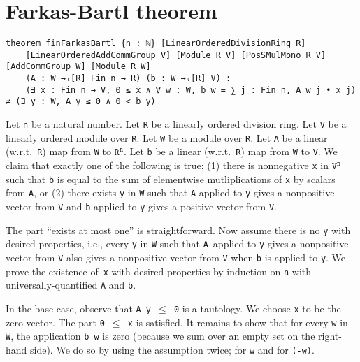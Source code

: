 \documentclass[]{article}
\begin{document}
	

\section {Farkas-Bartl theorem}

\begin{lstlisting}
theorem finFarkasBartl {n : ℕ} [LinearOrderedDivisionRing R]
    [LinearOrderedAddCommGroup V] [Module R V] [PosSMulMono R V] [AddCommGroup W] [Module R W]
    (A : W →ₗ[R] Fin n → R) (b : W →ₗ[R] V) :
    (∃ x : Fin n → V, 0 ≤ x ∧ ∀ w : W, b w = ∑ j : Fin n, A w j • x j) ≠ (∃ y : W, A y ≤ 0 ∧ 0 < b y)
\end{lstlisting}
Let \texttt{n} be a natural number.
Let \texttt{R} be a linearly ordered division ring.
Let \texttt{V} be a linearly ordered module over \texttt{R}.
Let \texttt{W} be a module over \texttt{R}.
Let \texttt{A} be a linear (w.r.t.~\texttt{R}) map from \texttt{W} to $\texttt{R}^{\texttt{n}}$.
Let \texttt{b} be a linear (w.r.t.~\texttt{R}) map from \texttt{W} to \texttt{V}.
We claim that exactly one of the following is true;
(1) there is nonnegative \texttt{x} in $\texttt{V}^{\texttt{n}}$ such that \texttt{b} is equal to
the sum of elementwise mutliplications of \texttt{x} by scalars from \texttt{A}, or
(2) there exists \texttt{y} in \texttt{W} such that \texttt{A} applied to \texttt{y}
gives a nonpositive vector from \texttt{V} and \texttt{b} applied to \texttt{y} gives
a positive vector from \texttt{V}.

The part ``exists at most one'' is straightforward.
Now assume there is no \texttt{y} with desired properties, i.e.,
every \texttt{y} in \texttt{W} such that \texttt{A}~applied to \texttt{y}
gives a nonpositive vector from \texttt{V} also gives a nonpositive vector from \texttt{V}
when \texttt{b} is applied to \texttt{y}.
We prove the existence of~\texttt{x} with desired properties by induction on \texttt{n}
with universally-quantified \texttt{A} and \texttt{b}.

In the base case, observe that \texttt{A y $\le$ 0} is a tautology.
We choose \texttt{x} to be the zero vector. The part \texttt{0 $\le$ x} is satisfied.
It remains to show that for every \texttt{w} in \texttt{W}, the application \texttt{b w}
is zero (because we sum over an empty set on the right-hand side).
We do so by using the assumption twice; for \texttt{w} and for \texttt{(-w)}.
\end{document}
